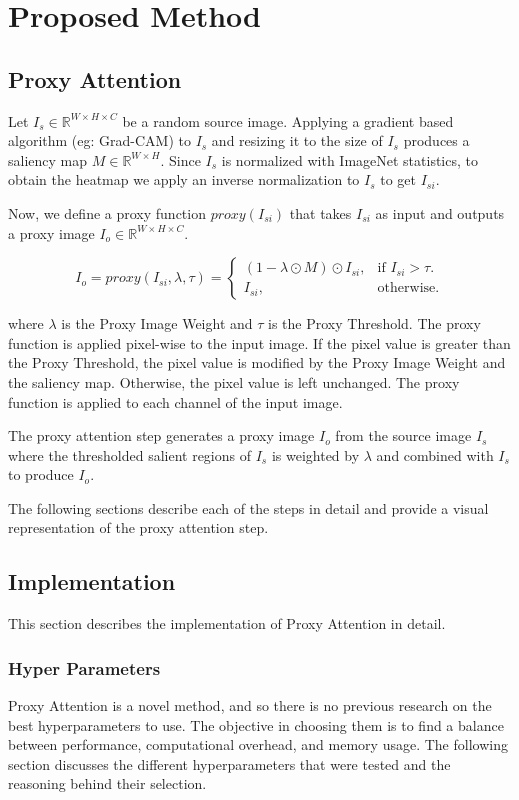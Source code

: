\chapter{Proposed Method} \label{ch:implementation}
\section{Proxy Attention}
Let $I_{s} \in \mathbb{R}^{W \times H \times C}$ be a random source image. 
Applying a gradient based algorithm (eg: Grad-CAM) to $I_{s}$ and resizing it to the size of $I_{s}$ produces a saliency map $M \in \mathbb{R}^{W \times H}$. 
Since $I_{s}$ is normalized with ImageNet statistics, to obtain the heatmap we apply an inverse normalization to $I_{s}$ to get $I_{si}$.

Now, we define a proxy function $proxy(I_{si})$ that takes $I_{si}$ as input and outputs a proxy image $I_{o} \in \mathbb{R}^{W \times H \times C}$.

\begin{equation}
    I_{o} = proxy(I_{si}, \lambda, \tau)=\begin{cases}
        (1- \lambda \odot M) \odot I_{si}, & \text{if $I_{si}> \tau$}.\\
        I_{si}, & \text{otherwise}.
    \end{cases}
\end{equation}

where $\lambda$ is the Proxy Image Weight and $\tau$ is the Proxy Threshold. The proxy function is applied pixel-wise to the input image. If the pixel value is greater than the Proxy Threshold, the pixel value is modified by the Proxy Image Weight and the saliency map. Otherwise, the pixel value is left unchanged. The proxy function is applied to each channel of the input image. 

The proxy attention step generates a proxy image $I_{o}$ from the source image $I_{s}$ where the thresholded salient regions of $I_{s}$ is weighted by $\lambda$ and combined with $I_{s}$ to produce $I_{o}$.

The following sections describe each of the steps in detail and provide a visual representation of the proxy attention step.

\section{Implementation}
This section describes the implementation of Proxy Attention in detail. 
\subsection{Hyper Parameters} \label{sec:hyperparameters}
Proxy Attention is a novel method, and so there is no previous research on the best hyperparameters to use. The objective in choosing them is to find a balance between performance, computational overhead, and memory usage. The following section discusses the different hyperparameters that were tested and the reasoning behind their selection.

